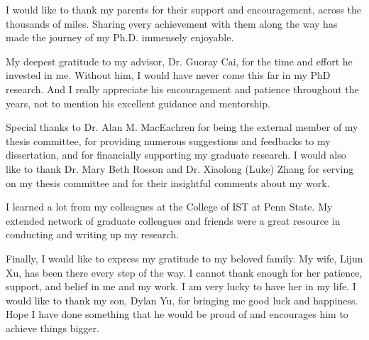 I would like to thank my parents for their support and encouragement, across the thousands of miles. Sharing every achievement with them along the way has made the journey of my Ph.D. immensely enjoyable.

My deepest gratitude to my advisor, Dr. Guoray Cai, for the time and effort he invested in me. Without him, I would have never come this far in my PhD research. And I really appreciate his encouragement and patience throughout the years, not to mention his excellent guidance and mentorship.

Special thanks to Dr. Alan M. MacEachren for being the external member of my thesis committee, for providing numerous suggestions and feedbacks to my dissertation, and for financially supporting my graduate research. I would also like to thank Dr. Mary Beth Rosson and Dr. Xiaolong (Luke) Zhang for serving on my thesis committee and for their insightful comments about my work. 

I learned a lot from my colleagues at the College of IST at Penn State. My extended network of graduate colleagues and friends were a great resource in conducting and writing up my research. 

Finally, I would like to express my gratitude to my beloved family. My wife, Lijun Xu, has been there every step of the way. I cannot thank enough for her patience, support, and belief in me and my work. I am very lucky to have her in my life. I would like to thank my son, Dylan Yu, for bringing me good luck and happiness. Hope I have done something that he would be proud of and encourages him to achieve things bigger.